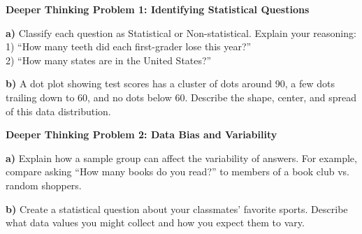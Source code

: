 \documentclass[12pt, letterpaper, fleqn]{article}
\begin{document}
\begin{tcolorbox}[colback=white, colframe=black, boxrule=1pt, arc=4mm, left=6mm, right=6mm, top=5mm, bottom=5mm]
\textbf{Deeper Thinking Problem 1: Identifying Statistical Questions}

\medskip

\noindent
\textbf{a)} Classify each question as Statistical or Non-statistical. Explain your reasoning: \\
1) ``How many teeth did each first-grader lose this year?'' \\
2) ``How many states are in the United States?''

\vspace{2.5cm}

\noindent
\textbf{b)} A dot plot showing test scores has a cluster of dots around 90, a few dots trailing down to 60, and no dots below 60. Describe the shape, center, and spread of this data distribution.

\vspace{2cm}
\end{tcolorbox}

\begin{tcolorbox}[colback=white, colframe=black, boxrule=1pt, arc=4mm, left=6mm, right=6mm, top=5mm, bottom=5mm]
\textbf{Deeper Thinking Problem 2: Data Bias and Variability}

\medskip

\noindent
\textbf{a)} Explain how a sample group can affect the variability of answers. For example, compare asking ``How many books do you read?'' to members of a book club vs. random shoppers.

\vspace{3cm}

\noindent
\textbf{b)} Create a statistical question about your classmates' favorite sports. Describe what data values you might collect and how you expect them to vary.

\vspace{4cm}
\end{tcolorbox}
\newpage
\end{document}
